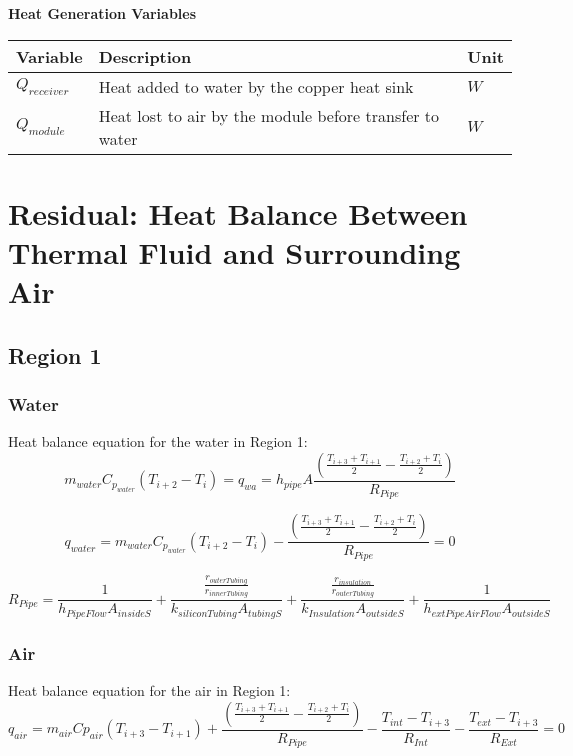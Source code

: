 \documentclass[12pt]{report}
\begin{document}
\begin{center}
	\textbf{Heat Generation Variables}
	\begin{tabular}{| l | l | l |}
		\hline
		Variable & Description & Unit  \\ \hline
		$Q_{receiver}$ & Heat added to water by the copper heat sink & $W$ \\ \hline
		$Q_{module}$ & Heat lost to air by the module before transfer to water & $W$ \\ \hline
	\end{tabular}
\end{center}

\section{Residual: Heat Balance Between Thermal Fluid and Surrounding Air}

\subsection{Region 1}
\subsubsection{Water}
Heat balance equation for the water in Region 1:
$$ m_{water} C_{p_{water}} (T_{i+2}-T_i) = q_{wa} = h_{pipe} A \frac
{\left( 
	\frac{T_{i+3}+T_{i+1}}{2} - \frac{T_{i+2}+T_{i}}{2} 
	\right)}
{R_{Pipe}} $$

\begin{equation}
\boxed{q_{water} = m_{water} C_{p_{water}} (T_{i+2}-T_i) - 
		\frac
			{\left( 
				\frac{T_{i+3}+T_{i+1}}{2} - \frac{T_{i+2}+T_{i}}{2} 
			\right)}
		{R_{Pipe}}
		= 0 }
\end{equation}

$$ R_{Pipe} = 
	\frac{1}
	{h_{PipeFlow} A_{insideS}} 
	+ \frac{
		\frac{r_{outerTubing}}
		{r_{innerTubing}}
		}
		{k_{siliconTubing} A_{tubingS}} 
	+ \frac{
		\frac{r_{insulation}}
		{r_{outerTubing}}
		}
		{k_{Insulation} A_{outsideS}} 
	+ \frac{1}
	{h_{extPipeAirFlow} A_{outsideS}} $$

\subsubsection{Air}
Heat balance equation for the air in Region 1:
\begin{equation}
\boxed{q_{air} = m_{air} Cp_{air} (T_{i+3}-T_{i+1}) 
	+ \frac{
		\left( 
			\frac{T_{i+3}+T_{i+1}}{2} 
			- \frac{T_{i+2}+T_{i}}{2} 
		\right)}
		{R_{Pipe}} 
	- \frac{T_{int} - T_{i+3}}{R_{Int}}
	- \frac{T_{ext} - T_{i+3}}{R_{Ext}} = 0}
\end{equation}
	
\end{document}
